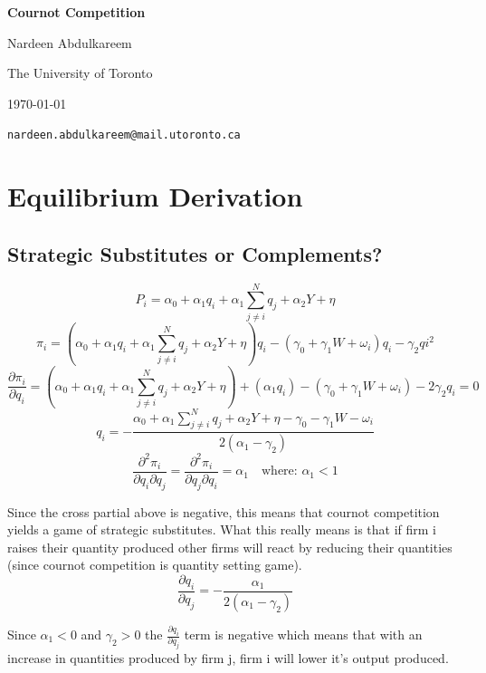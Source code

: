 \documentclass[12pt]{article}
\begin{document}
\begin{titlepage}
    \thispagestyle{empty} %
    \centering
    \vspace*{\fill}

    {\Large \textbf{Cournot Competition} \par}

    \vspace{3em}
    {\large Nardeen Abdulkareem \par}
    {\normalsize The University of Toronto \par}
    {\normalsize \today \par}
    {\texttt{nardeen.abdulkareem@mail.utoronto.ca} \par}

    \vspace*{\fill}
\end{titlepage}
\clearpage

\section{Equilibrium Derivation}
\subsection{Strategic Substitutes or Complements?}
$$P_i = \alpha_0 + \alpha_1 q_i + \alpha_1 \sum^N_{j \neq i}q_j + \alpha_2 Y + \eta$$
$$ \pi_i = (\alpha_0 + \alpha_1 q_i + \alpha_1 \sum^N_{j \neq i}q_j + \alpha_2 Y + \eta)q_i - (\gamma_0 + \gamma_1W + \omega_i)q_i - \gamma_2 qi^2$$
$$\frac{\partial \pi_i}{\partial q_i} = (\alpha_0 + \alpha_1 q_i + \alpha_1 \sum^N_{j \neq i}q_j + \alpha_2 Y + \eta) + (\alpha_1 q_i) - (\gamma_0 + \gamma_1W + \omega_i) - 2 \gamma_2 q_i = 0$$
$$q_i =  - \frac{\alpha_0 + \alpha_1 \sum^N_{j \neq i}q_j + \alpha_2 Y + \eta - \gamma_0 - \gamma_1W - \omega_i}{2(\alpha_1 - \gamma_2)} $$
$$\frac{\partial^2 \pi_i}{\partial q_i \partial q_j} = \frac{\partial^2 \pi_i}{\partial q_j \partial q_i} = \alpha_1 \quad \text{where: } \alpha_1 < 1$$

Since the cross partial above is negative, this means that cournot competition yields a game of strategic substitutes. What this really means is that if firm i raises their quantity produced other firms will react by reducing their quantities (since cournot competition is quantity setting game).
$$ \frac{\partial q_i}{\partial q_j} = - \frac{\alpha_1}{2(\alpha_1 - \gamma_2)}$$

Since $\alpha_1 < 0$ and $\gamma_2 > 0$ the $ \frac{\partial q_i}{\partial q_j}$ term is negative which means that with an increase in quantities produced by firm j, firm i will lower it's output produced.
\end{document}
